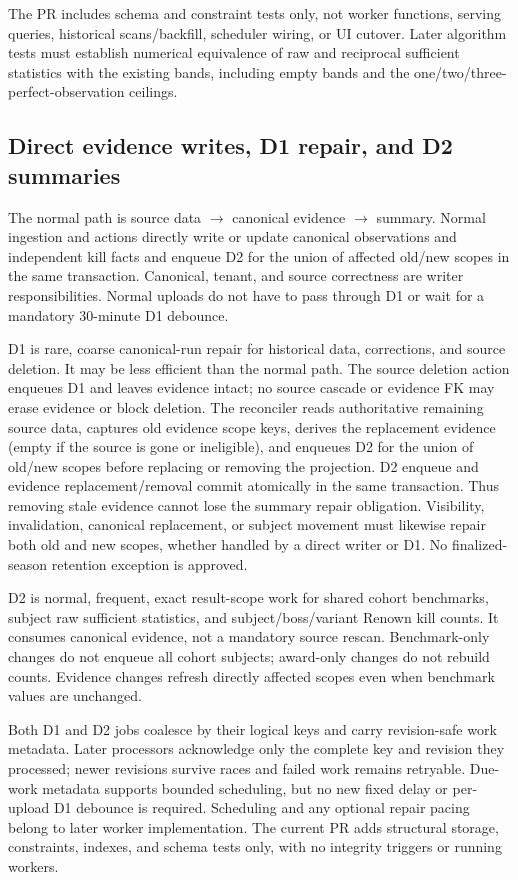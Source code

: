 \documentclass[11pt]{article}
\begin{document}
The PR includes schema and constraint tests only, not worker functions, serving queries, historical scans/backfill, scheduler wiring, or UI cutover. Later algorithm tests must establish numerical equivalence of raw and reciprocal sufficient statistics with the existing bands, including empty bands and the one/two/three-perfect-observation ceilings.

\subsection{Direct evidence writes, D1 repair, and D2 summaries}
The normal path is source data $\longrightarrow$ canonical evidence $\longrightarrow$ summary. Normal ingestion and actions directly write or update canonical observations and independent kill facts and enqueue D2 for the union of affected old/new scopes in the same transaction. Canonical, tenant, and source correctness are writer responsibilities. Normal uploads do not have to pass through D1 or wait for a mandatory 30-minute D1 debounce.

D1 is rare, coarse canonical-run repair for historical data, corrections, and source deletion. It may be less efficient than the normal path. The source deletion action enqueues D1 and leaves evidence intact; no source cascade or evidence FK may erase evidence or block deletion. The reconciler reads authoritative remaining source data, captures old evidence scope keys, derives the replacement evidence (empty if the source is gone or ineligible), and enqueues D2 for the union of old/new scopes before replacing or removing the projection. D2 enqueue and evidence replacement/removal commit atomically in the same transaction. Thus removing stale evidence cannot lose the summary repair obligation. Visibility, invalidation, canonical replacement, or subject movement must likewise repair both old and new scopes, whether handled by a direct writer or D1. No finalized-season retention exception is approved.

D2 is normal, frequent, exact result-scope work for shared cohort benchmarks, subject raw sufficient statistics, and subject/boss/variant Renown kill counts. It consumes canonical evidence, not a mandatory source rescan. Benchmark-only changes do not enqueue all cohort subjects; award-only changes do not rebuild counts. Evidence changes refresh directly affected scopes even when benchmark values are unchanged.

Both D1 and D2 jobs coalesce by their logical keys and carry revision-safe work metadata. Later processors acknowledge only the complete key and revision they processed; newer revisions survive races and failed work remains retryable. Due-work metadata supports bounded scheduling, but no new fixed delay or per-upload D1 debounce is required. Scheduling and any optional repair pacing belong to later worker implementation. The current PR adds structural storage, constraints, indexes, and schema tests only, with no integrity triggers or running workers.
\end{document}
